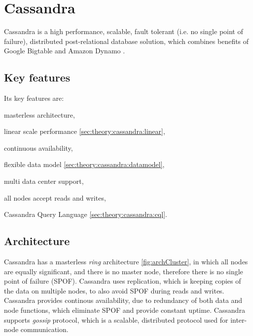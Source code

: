 
\section{Cassandra}
\label{sec:theory:cassandra}
Cassandra \cite{CassandraApacheDocs} \cite{CassandraDataStaxDocs} \cite{lakshman2010cassandra} is a high performance, scalable, fault tolerant (i.e. no single point of failure), distributed post-relational database solution, which combines benefits of Google Bigtable \cite{chang2008bigtable} and Amazon Dynamo \cite{decandia2007dynamo}.


\subsection{Key features}
Its key features are:
\begin{enumerate*}
\item masterless architecture,
\item linear scale performance \ref{sec:theory:cassandra:linear},
\item continuous availability,
\item flexible data model \ref{sec:theory:cassandra:datamodel},
\item multi data center support,
\item all nodes accept reads and writes,
\item Cassandra Query Language \ref{sec:theory:cassandra:cql}.
\end{enumerate*}

\subsection{Architecture}
Cassandra has a masterless \emph{ring} architecture \ref{fig:archCluster}, in which all nodes are equally significant, and there is no master node, therefore there is no single point of failure (SPOF). Cassandra uses replication, which is keeping copies of the data on multiple nodes, to also avoid SPOF during reads and writes. Cassandra provides continous availability, due to redundancy of both data and node functions, which eliminate SPOF and provide constant uptime.
Cassandra supports \emph{gossip} protocol, which is a scalable, distributed protocol used for inter-node communication.

